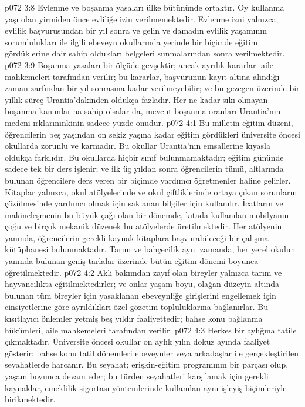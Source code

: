 \vs p072 3:8 Evlenme ve boşanma yasaları ülke bütününde ortaktır. Oy kullanma yaşı olan yirmiden önce evliliğe izin verilmemektedir. Evlenme izni yalnızca; evlilik başvurusundan bir yıl sonra ve gelin ve damadın evlilik yaşamının sorumlulukları ile ilgili ebeveyn okullarında yerinde bir biçimde eğitim gördüklerine dair sahip oldukları belgeleri sunmalarından sonra verilmektedir.
\vs p072 3:9 Boşanma yasaları bir ölçüde gevşektir; ancak ayrılık kararları aile mahkemeleri tarafından verilir; bu kararlar, başvurunun kayıt altına alındığı zaman zarfından bir yıl sonrasına kadar verilmeyebilir; ve bu gezegen üzerinde bir yıllık süreç Urantia’dakinden oldukça fazladır. Her ne kadar sıkı olmayan boşanma kanunlarına sahip olsalar da, mevcut boşanma oranları Urantia’nın medeni ırklarınınkinin sadece yüzde onudur.
\vs p072 4:1 Bu milletin eğitim düzeni, öğrencilerin beş yaşından on sekiz yaşına kadar eğitim gördükleri üniversite öncesi okullarda zorunlu ve karmadır. Bu okullar Urantia’nın emsallerine kıyasla oldukça farklıdır. Bu okullarda hiçbir sınıf bulunmamaktadır; eğitim gününde sadece tek bir ders işlenir; ve ilk üç yıldan sonra öğrencilerin tümü, altlarında bulunan öğrencilere ders veren bir biçimde yardımcı öğretmenler haline gelirler. Kitaplar yalnızca, okul atölyelerinde ve okul çiftliklerinde ortaya çıkan sorunların çözülmesinde yardımcı olmak için saklanan bilgiler için kullanılır. İcatların ve makineleşmenin bu büyük çağı olan bir dönemde, kıtada kullanılan mobilyanın çoğu ve birçok mekanik düzenek bu atölyelerde üretilmektedir. Her atölyenin yanında, öğrencilerin gerekli kaynak kitaplara başvurabileceği bir çalışma kütüphanesi bulunmaktadır. Tarım ve bahçecilik aynı zamanda, her yerel okulun yanında bulunan geniş tarlalar üzerinde bütün eğitim dönemi boyunca öğretilmektedir.
\vs p072 4:2 Akli bakımdan zayıf olan bireyler yalnızca tarım ve hayvancılıkta eğitilmektedirler; ve onlar yaşam boyu, olağan düzeyin altında bulunan tüm bireyler için yasaklanan ebeveynliğe girişlerini engellemek için cinsiyetlerine göre ayrıldıkları özel gözetim topluluklarına bağlanırlar. Bu kısıtlayıcı önlemler yetmiş beş yıldır faaliyettedir; bahse konu bağlanma hükümleri, aile mahkemeleri tarafından verilir.
\vs p072 4:3 Herkes bir aylığına tatile çıkmaktadır. Üniversite öncesi okullar on aylık yılın dokuz ayında faaliyet gösterir; bahse konu tatil dönemleri ebeveynler veya arkadaşlar ile gerçekleştirilen seyahatlerde harcanır. Bu seyahat; erişkin\hyp{}eğitim programının bir parçası olup, yaşam boyunca devam eder; bu türden seyahatleri karşılamak için gerekli kaynaklar, emeklilik sigortası yöntemlerinde kullanılan aynı işleyiş biçimleriyle birikmektedir.
